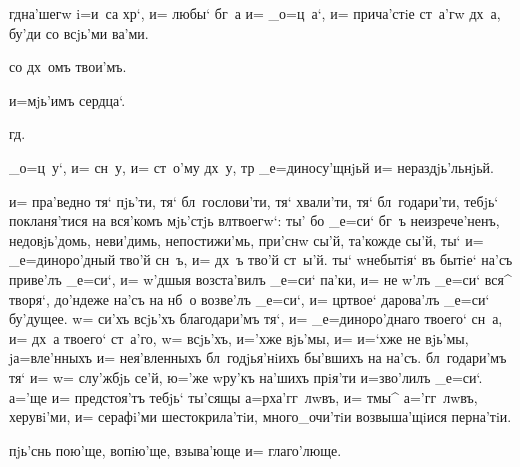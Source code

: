 
 гд на'шегw i=и~са хр`, и= любы` бг~а 
и= _о=ц~а`, и= прича'стiе ст~а'гw дх~а, бу'ди со всjь'ми 
ва'ми.

 со дх~омъ твои'мъ.

  и=мjь'имъ сердца`.


  гд.

_о=ц~у`, и= сн~у, и= ст~о'му дх~у, тр 
_е=диносу'щнjьй и= нераздjь'льнjьй.


 и= пра'ведно тя` пjь'ти, тя` бл~гослови'ти, 
тя` хвали'ти, тя` бл~годари'ти, тебjь` покланя'тися на 
вся'комъ мjь'стjь вл твоегw`: ты' бо _е=си` бг~ъ 
неизрече'ненъ, недовjь'домь, неви'димь, непостижи'мь, 
при'снw сы'й, та'кожде сы'й, ты` и= _е=диноро'дный тво'й 
сн~ъ, и= дх~ъ тво'й ст~ы'й. ты` w\т небытiя` въ бытiе` 
на'съ приве'лъ _е=си`, и= w'дшыя возста'вилъ _е=си` 
па'ки, и= не w'лъ _е=си` вся^ творя`, до'ндеже 
на'съ на нб~о возве'лъ _е=си`, и= цр твое` дарова'лъ 
_е=си` бу'дущее. w= си'хъ всjь'хъ благодари'мъ тя`, и= 
_е=диноро'днаго твоего` сн~а, и= дх~а твоего` ст~а'го, w= 
всjь'хъ, и='хже вjь'мы, и= и=`хже не вjь'мы, jа=вле'нныхъ 
и= нея'вленныхъ бл~годjья'нiихъ бы'вшихъ на на'съ. 
бл~годари'мъ тя` и= w= слу'жбjь се'й, ю='же w\т ру'къ 
на'шихъ прiя'ти и=зво'лилъ _е=си`. а='ще и= предстоя'тъ 
тебjь` ты'сящы а=рха'гг~лwвъ, и= тмы^ а='гг~лwвъ, 
херувi'ми, и= серафi'ми шестокрила'тiи, много_очи'тiи 
возвыша'щiися перна'тiи.

  пjь'снь пою'ще, вопiю'ще, 
взыва'юще и= глаго'люще.



